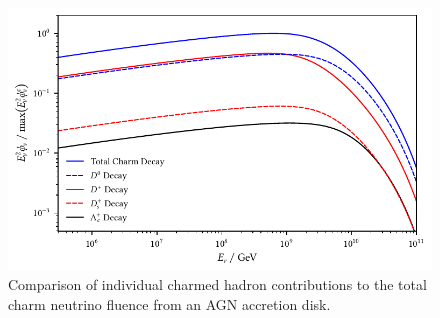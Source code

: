 \begin{figure}[H]
	\centering
	\includegraphics{../plots/build/nucleus_charm_decay_comparison.pdf}
	\caption[AGN accretion disk $\nu \kern+0.5pt$ fluence from $c$ decay.]
			{Comparison of individual charmed hadron contributions to the total charm neutrino fluence
			 from an AGN accretion disk.}
	\label{fig:nucleus-charm-comparison}
\end{figure}
